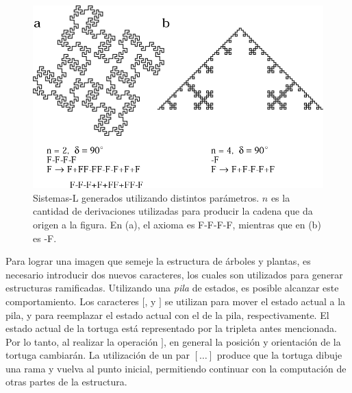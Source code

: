 \begin{figure}
\center
\includegraphics[width=13cm]{figures/sistemasL}
\caption[Sistemas-L generados utilizando distintos parámetros]{Sistemas-L generados utilizando distintos parámetros. $n$ es la cantidad de derivaciones utilizadas para producir la cadena que da origen a la figura. En (a), el axioma es F-F-F-F, mientras que en (b) es -F.}
\label{fg:sistemasL}
\end{figure}

Para lograr una imagen que semeje la estructura de árboles y plantas, es necesario introducir dos nuevos caracteres, los cuales son utilizados para generar estructuras ramificadas.
Utilizando una {\em pila} de estados, es posible alcanzar este comportamiento.
Los caracteres $[$, y $]$ se utilizan para mover el estado actual a la pila, y para reemplazar el estado actual con el de la pila, respectivamente.
El estado actual de la tortuga está representado por la tripleta antes mencionada.
Por lo tanto, al realizar la operación $]$, en general la posición y orientación de la tortuga cambiarán.
La utilización de un par $[\dots]$ produce que la tortuga dibuje una rama y vuelva al punto inicial, permitiendo continuar con la computación de otras partes de la estructura.

